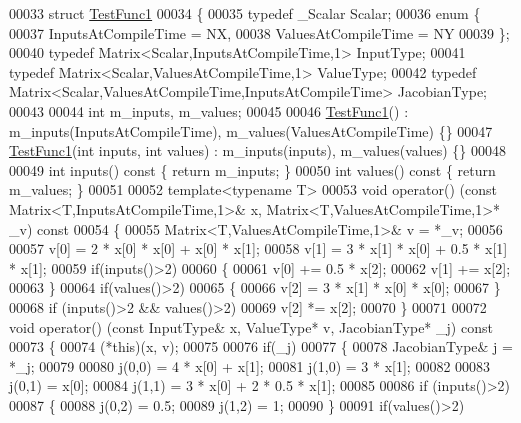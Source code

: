 \begin{DoxyCode}
00033 \textcolor{keyword}{struct }\hyperlink{struct_test_func1}{TestFunc1}
00034 \{
00035   \textcolor{keyword}{typedef} \_Scalar Scalar;
00036   \textcolor{keyword}{enum} \{
00037     InputsAtCompileTime = NX,
00038     ValuesAtCompileTime = NY
00039   \};
00040   \textcolor{keyword}{typedef} Matrix<Scalar,InputsAtCompileTime,1> InputType;
00041   \textcolor{keyword}{typedef} Matrix<Scalar,ValuesAtCompileTime,1> ValueType;
00042   \textcolor{keyword}{typedef} Matrix<Scalar,ValuesAtCompileTime,InputsAtCompileTime> JacobianType;
00043 
00044   \textcolor{keywordtype}{int} m\_inputs, m\_values;
00045 
00046   \hyperlink{struct_test_func1}{TestFunc1}() : m\_inputs(InputsAtCompileTime), m\_values(ValuesAtCompileTime) \{\}
00047   \hyperlink{struct_test_func1}{TestFunc1}(\textcolor{keywordtype}{int} inputs, \textcolor{keywordtype}{int} values) : m\_inputs(inputs), m\_values(values) \{\}
00048 
00049   \textcolor{keywordtype}{int} inputs()\textcolor{keyword}{ const }\{ \textcolor{keywordflow}{return} m\_inputs; \}
00050   \textcolor{keywordtype}{int} values()\textcolor{keyword}{ const }\{ \textcolor{keywordflow}{return} m\_values; \}
00051 
00052   \textcolor{keyword}{template}<\textcolor{keyword}{typename} T>
00053   \textcolor{keywordtype}{void} operator() (\textcolor{keyword}{const} Matrix<T,InputsAtCompileTime,1>& x, Matrix<T,ValuesAtCompileTime,1>* \_v)\textcolor{keyword}{ const}
00054 \textcolor{keyword}{  }\{
00055     Matrix<T,ValuesAtCompileTime,1>& v = *\_v;
00056 
00057     v[0] = 2 * x[0] * x[0] + x[0] * x[1];
00058     v[1] = 3 * x[1] * x[0] + 0.5 * x[1] * x[1];
00059     \textcolor{keywordflow}{if}(inputs()>2)
00060     \{
00061       v[0] += 0.5 * x[2];
00062       v[1] += x[2];
00063     \}
00064     \textcolor{keywordflow}{if}(values()>2)
00065     \{
00066       v[2] = 3 * x[1] * x[0] * x[0];
00067     \}
00068     \textcolor{keywordflow}{if} (inputs()>2 && values()>2)
00069       v[2] *= x[2];
00070   \}
00071 
00072   \textcolor{keywordtype}{void} operator() (\textcolor{keyword}{const} InputType& x, ValueType* v, JacobianType* \_j)\textcolor{keyword}{ const}
00073 \textcolor{keyword}{  }\{
00074     (*this)(x, v);
00075 
00076     \textcolor{keywordflow}{if}(\_j)
00077     \{
00078       JacobianType& j = *\_j;
00079 
00080       j(0,0) = 4 * x[0] + x[1];
00081       j(1,0) = 3 * x[1];
00082 
00083       j(0,1) = x[0];
00084       j(1,1) = 3 * x[0] + 2 * 0.5 * x[1];
00085 
00086       \textcolor{keywordflow}{if} (inputs()>2)
00087       \{
00088         j(0,2) = 0.5;
00089         j(1,2) = 1;
00090       \}
00091       \textcolor{keywordflow}{if}(values()>2)

\end{DoxyCode}
